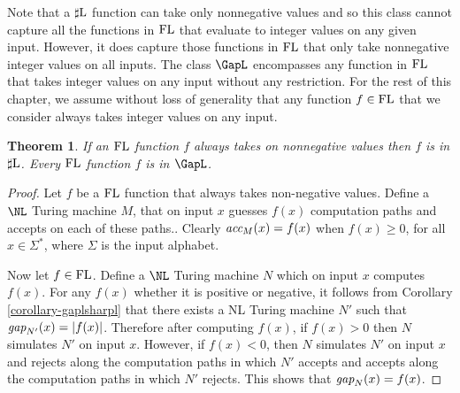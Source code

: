 \documentclass{amsbook}
\newtheorem{theorem}{Theorem}[chapter]
\theoremstyle{definition}
\theoremstyle{remark}
\numberwithin{section}{chapter}
\numberwithin{equation}{chapter}
\newcommand{\sharpL}{\mbox{$\sharp$\rm L}}
\newcommand{\FL}{\mbox{\rm FL}}
\newcommand{\acc}{\mbox{\it acc}}
\newcommand{\gap}{\mbox{\it gap}}
\begin{document}
Note that a $\sharpL$ function can take only nonnegative values and so this class cannot capture all the functions in $\FL$ that evaluate to integer values on any given input. However, it does capture those functions in $\FL$ that only take nonnegative integer values on all inputs. The class $\GapL$ encompasses any function in $\FL$ that takes integer values on any input without any restriction. For the rest of this chapter, we assume without loss of generality that any function $f\in \FL$ that we consider always takes integer values on any input.
\begin{theorem}
If an $\FL$ function $f$ always takes on nonnegative values then $f$ is in $\sharpL$. Every $\FL$ function $f$ is in $\GapL$.
\end{theorem}
\begin{proof}
Let $f$ be a $\FL$ function that always takes non-negative values. Define a $\NL$ Turing machine $M$, that on input $x$ guesses $f(x)$ computation paths and accepts on each of these paths.. Clearly $\acc_M(x)=f(x)$ when $f(x)\geq 0$, for all $x\in\Sigma^*$, where $\Sigma$ is the input alphabet.

Now let $f\in\FL$. Define a $\NL$ Turing machine $N$ which on input $x$ computes $f(x)$. For any $f(x)$ whether it is positive or negative, it follows from Corollary \ref{corollary-gaplsharpl} that there exists a NL Turing machine $N'$ such that $\gap_{N'}(x)=|f(x)|$. Therefore after computing $f(x)$, if $f(x)>0$ then $N$ simulates $N'$ on input $x$. However, if $f(x)<0$, then $N$ simulates $N'$ on input $x$ and rejects along the computation paths in which $N'$ accepts and accepts along the computation paths in which $N'$ rejects. This shows that $\gap_N(x)=f(x)$.
\end{proof}
\end{document}
